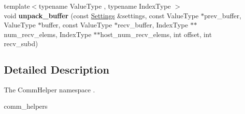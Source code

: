 \begin{DoxyCompactItemize}
\item 
\mbox{\label{namespaceschwz_1_1CommHelpers_a11798855a0b37f48deb5ba25eaa8ca50}} 
{\footnotesize template$<$typename Value\+Type , typename Index\+Type $>$ }\\void {\bfseries unpack\+\_\+buffer} (const \hyperlink{structschwz_1_1Settings}{Settings} \&settings, const Value\+Type $\ast$prev\+\_\+buffer, Value\+Type $\ast$buffer, const Value\+Type $\ast$recv\+\_\+buffer, Index\+Type $\ast$$\ast$num\+\_\+recv\+\_\+elems, Index\+Type $\ast$$\ast$host\+\_\+num\+\_\+recv\+\_\+elems, int offset, int recv\+\_\+subd)
\end{DoxyCompactItemize}


\subsection{Detailed Description}
The Comm\+Helper namespace . 

comm\+\_\+helpers 